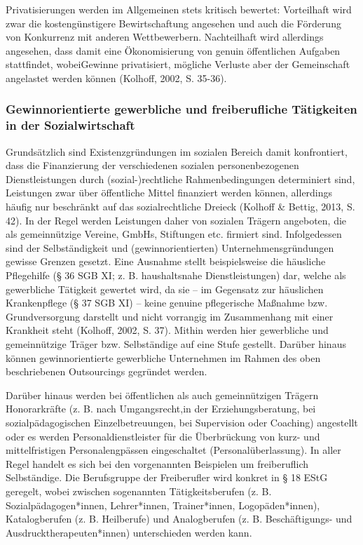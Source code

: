 \documentclass[
  letterpaper,
]{book}
\begin{document}
Privatisierungen werden im Allgemeinen stets kritisch bewertet:
Vorteilhaft wird zwar die kostengünstigere Bewirtschaftung angesehen und
auch die Förderung von Konkurrenz mit anderen Wettbewerbern.
Nachteilhaft wird allerdings angesehen, dass damit eine Ökonomisierung
von genuin öffentlichen Aufgaben stattfindet, wobeiGewinne privatisiert,
mögliche Verluste aber der Gemeinschaft angelastet werden können
(Kolhoff, 2002, S. 35-36).

\subsubsection{Gewinnorientierte gewerbliche und freiberufliche
Tätigkeiten in der
Sozialwirtschaft}\label{gewinnorientierte-unternehmen}

Grundsätzlich sind Existenzgründungen im sozialen Bereich damit
konfrontiert, dass die Finanzierung der verschiedenen sozialen
personenbezogenen Dienstleistungen durch (sozial-)rechtliche
Rahmenbedingungen determiniert sind, Leistungen zwar über öffentliche
Mittel finanziert werden können, allerdings häufig nur beschränkt auf
das sozialrechtliche Dreieck (Kolhoff \& Bettig, 2013, S. 42). In der
Regel werden Leistungen daher von sozialen Trägern angeboten, die als
gemeinnützige Vereine, GmbHs, Stiftungen etc. firmiert sind.
Infolgedessen sind der Selbständigkeit und (gewinnorientierten)
Unternehmensgründungen gewisse Grenzen gesetzt. Eine Ausnahme stellt
beispielsweise die häusliche Pflegehilfe (§ 36 SGB XI; z. B.
haushaltsnahe Dienstleistungen) dar, welche als gewerbliche Tätigkeit
gewertet wird, da sie -- im Gegensatz zur häuslichen Krankenpflege (§ 37
SGB XI) -- keine genuine pflegerische Maßnahme bzw. Grundversorgung
darstellt und nicht vorrangig im Zusammenhang mit einer Krankheit steht
(Kolhoff, 2002, S. 37). Mithin werden hier gewerbliche und gemeinnützige
Träger bzw. Selbständige auf eine Stufe gestellt. Darüber hinaus können
gewinnorientierte gewerbliche Unternehmen im Rahmen des oben
beschriebenen Outsourcings gegründet werden.

Darüber hinaus werden bei öffentlichen als auch gemeinnützigen Trägern
Honorarkräfte (z. B. nach Umgangsrecht,in der Erziehungsberatung, bei
sozialpädagogischen Einzelbetreuungen, bei Supervision oder Coaching)
angestellt oder es werden Personaldienstleister für die Überbrückung von
kurz- und mittelfristigen Personalengpässen eingeschaltet
(Personalüberlassung). In aller Regel handelt es sich bei den
vorgenannten Beispielen um freiberuflich Selbständige. Die Berufsgruppe
der Freiberufler wird konkret in § 18 EStG geregelt, wobei zwischen
sogenannten Tätigkeitsberufen (z. B. Sozialpädagogen*innen,
Lehrer*innen, Trainer*innen, Logopäden*innen), Katalogberufen (z. B.
Heilberufe) und Analogberufen (z. B. Beschäftigungs- und
Ausdrucktherapeuten*innen) unterschieden werden kann.
\end{document}
